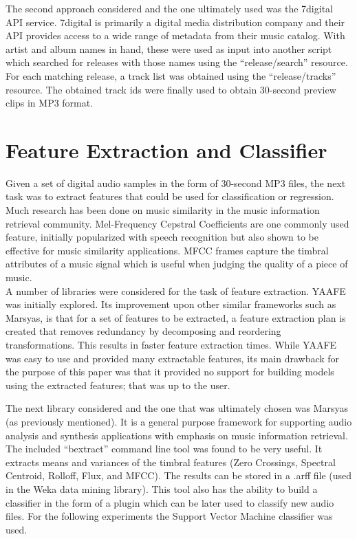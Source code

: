 \documentclass{acm_proc_article-sp}
\begin{document}
The second approach considered and the one ultimately used was the 7digital API
service. 7digital is primarily a digital media distribution company
and their API provides access to a wide range of metadata from their music catalog.
With artist and album names in hand, these were used as input into another script
which searched for releases with those names using the ``release/search'' resource.
For each matching release, a track list was obtained using the ``release/tracks'' resource.
The obtained track ids were finally used to obtain 30-second preview clips in MP3 format.


\section{Feature Extraction and Classifier}
Given a set of digital audio samples in the form of 30-second MP3 files, the next
task was to extract features that could be used for classification or regression.
Much research has been done on music similarity in the music information retrieval community.
Mel-Frequency Cepstral Coefficients are one commonly used feature, initially popularized
with speech recognition \cite{Hunt1980} but also shown to be effective for music
similarity applications. MFCC frames capture the timbral attributes of a music signal \cite{Jacobson2006}
which is useful when judging the quality of a piece of music.\\
A number of libraries were considered for the task of feature extraction.
YAAFE \cite{Mathieu2010} was initially explored. Its improvement upon 
other similar frameworks such as Marsyas, is that for a set of features
to be extracted, a feature extraction plan is created that removes redundancy
by decomposing and reordering transformations. This results in faster 
feature extraction times. While YAAFE was easy to use and provided many
extractable features, its main drawback for the purpose of this paper was
that it provided no support for building models using the extracted
features; that was up to the user. 

The next library considered and the one that was ultimately chosen 
was Marsyas \cite{Tzanetakis2000}(as previously
mentioned). It is a general purpose framework for supporting audio analysis and 
synthesis applications with emphasis on music information retrieval. The included
``bextract'' command line tool \cite{MarsyasDoc} was found to be very useful. 
It extracts means and variances of the timbral features (Zero Crossings,
Spectral Centroid, Rolloff, Flux, and MFCC). The results can be stored in 
a .arff file (used in the Weka data mining library). This tool also 
has the ability to build a classifier in the form of a plugin which 
can be later used to classify new audio files. For the following experiments
the Support Vector Machine classifier was used.
\end{document}
